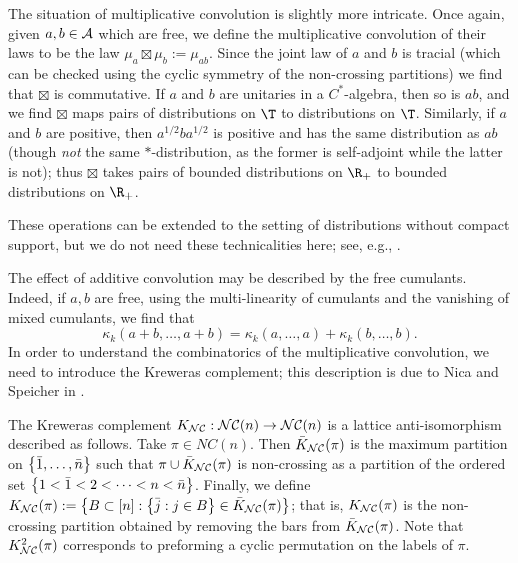 The situation of multiplicative convolution is slightly more intricate.
Once again, given $a, b \in \mathcal{A}$ which are free, we define the multiplicative convolution of their laws to be the law $\mu_a\boxtimes\mu_b := \mu_{ab}$.
Since the joint law of $a$ and $b$ is tracial (which can be checked using the cyclic symmetry of the non-crossing partitions) we find that $\boxtimes$ is commutative.
If $a$ and $b$ are unitaries in a $C^*$-algebra, then so is $ab$, and we find $\boxtimes$ maps pairs of distributions on $\T$ to distributions on $\T$.
Similarly, if $a$ and $b$ are positive, then $a^{1/2}ba^{1/2}$ is positive and has the same distribution as $ab$ (though \emph{not} the same $*$-distribution, as the former is self-adjoint while the latter is not); thus $\boxtimes$ takes pairs of bounded distributions on $\R_+$ to bounded distributions on $\R_+$.

These operations can be extended to the setting of distributions without compact support, but we do not need these technicalities here; see, e.g., \cite{bercovoicu1993}.

The effect of additive convolution may be described by the free cumulants.
Indeed, if $a, b$ are free, using the multi-linearity of cumulants and the vanishing of mixed cumulants, we find that
$$\kappa_k(a+b, \ldots, a+b) = \kappa_k(a, \ldots, a) + \kappa_k(b, \ldots, b).$$
In order to understand the combinatorics of the multiplicative convolution, we need to introduce the Kreweras complement; this description is due to Nica and Speicher in \cite{nicaspeicher1997}.

The Kreweras complement $K_{\mathcal{NC}} : \mathcal{NC}(n) \to \mathcal{NC}(n)$ is a lattice anti-isomorphism described as follows.
Take $\pi \in NC(n)$.
Then $\bar{K}_{\mathcal{NC}}(\pi)$ is the maximum partition on $\left\{\bar1, \ldots, \bar n\right\}$ such that $\pi \cup \bar{K}_{\mathcal{NC}}(\pi)$ is non-crossing as a partition of the ordered set $\left\{1 < \bar1 < 2 < \cdots < n < \bar n\right\}$.
Finally, we define $K_{\mathcal{NC}}(\pi) := \left\{B \subset [n] : \left\{\bar{j} : j \in B\right\} \in \bar{K}_{\mathcal{NC}}(\pi)\right\}$; that is, $K_{\mathcal{NC}}(\pi)$ is the non-crossing partition obtained by removing the bars from $\bar{K}_{\mathcal{NC}}(\pi)$.
Note that $K_{\mathcal{NC}}^2(\pi)$ corresponds to preforming a cyclic permutation on the labels of $\pi$.

